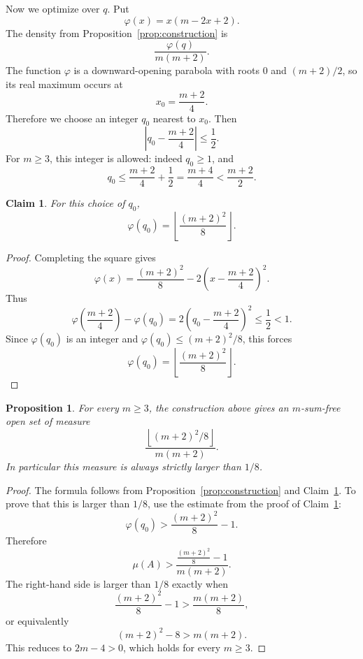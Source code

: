 \documentclass{article}
\newtheorem{proposition}{Proposition}
\newtheorem{claim}{Claim}
\begin{document}
Now we optimize over \(q\). Put
\[
    \varphi(x)=x(m-2x+2).
\]
The density from Proposition~\ref{prop:construction} is
\[
    \frac{\varphi(q)}{m(m+2)}.
\]
The function \(\varphi\) is a downward-opening parabola with roots \(0\) and
\((m+2)/2\), so its real maximum occurs at
\[
    x_0=\frac{m+2}{4}.
\]
Therefore we choose an integer \(q_0\) nearest to \(x_0\). Then
\[
    \left|q_0-\frac{m+2}{4}\right|\leq \frac12.
\]
For \(m\geq 3\), this integer is allowed: indeed \(q_0\geq 1\), and
\[
    q_0
    \leq
    \frac{m+2}{4}+\frac12
    =
    \frac{m+4}{4}
    <
    \frac{m+2}{2}.
\]

\begin{claim}\label{claim:nearest_integer}
For this choice of \(q_0\),
\[
    \varphi(q_0)
    =
    \left\lfloor \frac{(m+2)^2}{8}\right\rfloor.
\]
\end{claim}

\begin{proof}
Completing the square gives
\[
    \varphi(x)
    =
    \frac{(m+2)^2}{8}
    -
    2\left(x-\frac{m+2}{4}\right)^2.
\]
Thus
\[
    \varphi\left(\frac{m+2}{4}\right)-\varphi(q_0)
    =
    2\left(q_0-\frac{m+2}{4}\right)^2
    \leq
    \frac12
    <1.
\]
Since \(\varphi(q_0)\) is an integer and
\(\varphi(q_0)\leq (m+2)^2/8\), this forces
\[
    \varphi(q_0)
    =
    \left\lfloor \frac{(m+2)^2}{8}\right\rfloor.
\]
\end{proof}

\begin{proposition}\label{prop:optimized_density}
For every \(m\geq 3\), the construction above gives an \(m\)-sum-free open set
of measure
\[
    \frac{\left\lfloor (m+2)^2/8\right\rfloor}{m(m+2)}.
\]
In particular this measure is always strictly larger than \(1/8\).
\end{proposition}

\begin{proof}
The formula follows from Proposition~\ref{prop:construction} and
Claim~\ref{claim:nearest_integer}. To prove that this is larger than \(1/8\),
use the estimate from the proof of Claim~\ref{claim:nearest_integer}:
\[
    \varphi(q_0)>
    \frac{(m+2)^2}{8}-1.
\]
Therefore
\[
    \mu(A)
    >
    \frac{\frac{(m+2)^2}{8}-1}{m(m+2)}.
\]
The right-hand side is larger than \(1/8\) exactly when
\[
    \frac{(m+2)^2}{8}-1>\frac{m(m+2)}{8},
\]
or equivalently
\[
    (m+2)^2-8>m(m+2).
\]
This reduces to \(2m-4>0\), which holds for every \(m\geq 3\).
\end{proof}
\end{document}
